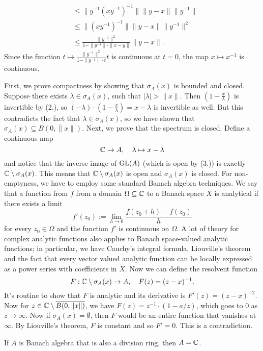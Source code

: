 \begin{myproof}
\begin{align*}
    &\leq \| y^{-1} (xy^{-1})^{-1}\| \| y - x\| \| y^{-1}\|\\
    &\leq \|(xy^{-1})^{-1}\| \| y - x\| \| y^{-1}\|^2\\
    &\leq \frac{\| y^{-1}\|^2}{1 - \|y^{-1}\| \cdot \|x - y\|} \| y - x\|.
  \end{align*}
  Since the function $t \mapsto \frac{\| y^{-1}\|^2}{1 - \|y^{-1}\| \cdot t} t$ is continuous at $t = 0$, the map $x \mapsto x^{-1}$ is continuous.
  \item First, we prove compactness by showing that $\sigma_A (x)$ is bounded and closed. 
  Suppose there exists $\lambda \in \sigma_A (x)$, such that $|\lambda| > \| x\|$.
  Then $\left(1 - \frac{x}{\lambda}\right)$ is invertible by (2.), so $(- \lambda) \cdot \left(1 - \frac{x}{\lambda}\right) = x - \lambda$
  is invertible as well. But this contradicts the fact that $\lambda \in \sigma_A (x)$, so we have shown that 
  $\sigma_A (x) \subseteq \overline{B(0, \| x\|)}$.
  Next, we prove that the spectrum is closed.
  Define a continuous map $$\mathbb {C} \to A,\quad \lambda \mapsto x - \lambda$$
  and notice that the inverse image of $\operatorname{GL} (A)$ (which is open by (3.)) is exactly $\mathbb {C} \setminus \sigma_A (x)$.
  This means that $\mathbb {C} \setminus \sigma_A (x)$ is open and $\sigma_A (x)$ is closed.
  For non-emptyness, we have to employ some standard Banach algebra techniques.
  We say that a function from $f$ from a domain $\Omega \subseteq \mathbb {C}$ to a Banach space $X$ is analytical 
  if there exists a limit $$f'(z_0) := \lim_{h \to 0} \frac{f(z_0 + h) - f(z_0)}{h}$$
  for every $z_0 \in \Omega$ and the function $f'$ is continuous on $\Omega$.
  A lot of theory for complex analytic functions also applies to Banach space-valued analytic functions; 
  in particular, we have Cauchy's integral formula, Liouville's theorem and the fact that every vector valued analytic function 
  can be locally expressed as a power series with coefficients in $X$. Now we can define the resolvent function 
  $$F: \mathbb {C} \setminus \sigma_A (x) \to A,\quad F(z) = (z - x)^{-1}.$$
  It's routine to show that $F$ is analytic and its derivative is $F'(z) = (z - x)^{-2}$. Now for 
  $z \in \mathbb {C} \setminus \overline{B(0, \| x\|)}$, we have $F(z) = z^{-1} \cdot (1 - a/z)$,
  which goes to $0$ as $z \to \infty$. Now if $\sigma_A (x) = \emptyset$,
  then $F$ would be an entire function that vanishes at $\infty$.
  By Liouville's theorem, $F$ is constant and so $F' = 0$. This is a contradiction.
\end{myproof}

\begin{theorem}
  If $A$ is Banach algebra that is also a division ring, then $A = \mathbb {C}$.
\end{theorem}

